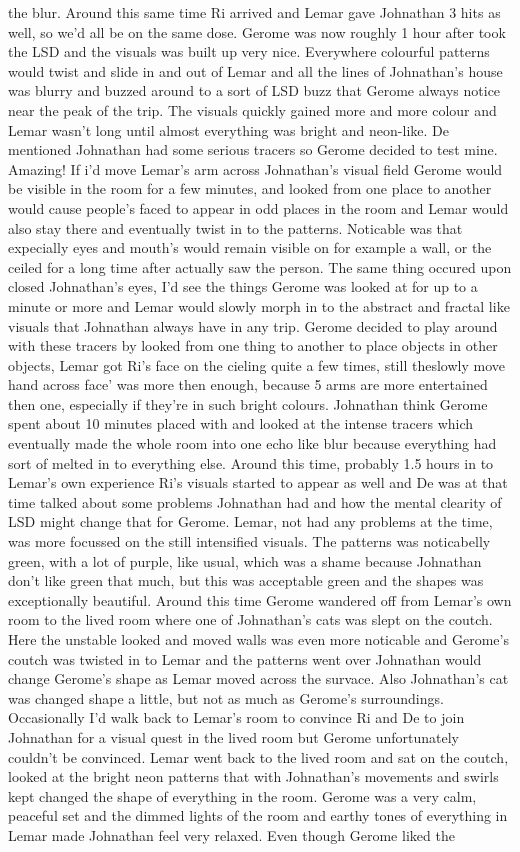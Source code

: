 \documentclass[12pt]{book}
\begin{document}
the blur. Around this same time Ri arrived and Lemar gave Johnathan 3 hits as well, so we'd all be on the same dose. Gerome was now roughly 1 hour after took the LSD and the visuals was built up very nice. Everywhere colourful patterns would twist and slide in and out of Lemar and all the lines of Johnathan's house was blurry and buzzed around to a sort of LSD buzz that Gerome always notice near the peak of the trip. The visuals quickly gained more and more colour and Lemar wasn't long until almost everything was bright and neon-like. De mentioned Johnathan had some serious tracers so Gerome decided to test mine. Amazing! If i'd move Lemar's arm across Johnathan's visual field Gerome would be visible in the room for a few minutes, and looked from one place to another would cause people's faced to appear in odd places in the room and Lemar would also stay there and eventually twist in to the patterns. Noticable was that expecially eyes and mouth's would remain visible on for example a wall, or the ceiled for a long time after actually saw the person. The same thing occured upon closed Johnathan's eyes, I'd see the things Gerome was looked at for up to a minute or more and Lemar would slowly morph in to the abstract and fractal like visuals that Johnathan always have in any trip. Gerome decided to play around with these tracers by looked from one thing to another to place objects in other objects, Lemar got Ri's face on the cieling quite a few times, still theslowly move hand across face' was more then enough, because 5 arms are more entertained then one, especially if they're in such bright colours. Johnathan think Gerome spent about 10 minutes placed with and looked at the intense tracers which eventually made the whole room into one echo like blur because everything had sort of melted in to everything else. Around this time, probably 1.5 hours in to Lemar's own experience Ri's visuals started to appear as well and De was at that time talked about some problems Johnathan had and how the mental clearity of LSD might change that for Gerome. Lemar, not had any problems at the time, was more focussed on the still intensified visuals. The patterns was noticabelly green, with a lot of purple, like usual, which was a shame because Johnathan don't like green that much, but this was acceptable green and the shapes was exceptionally beautiful. Around this time Gerome wandered off from Lemar's own room to the lived room where one of Johnathan's cats was slept on the coutch. Here the unstable looked and moved walls was even more noticable and Gerome's coutch was twisted in to Lemar and the patterns went over Johnathan would change Gerome's shape as Lemar moved across the survace. Also Johnathan's cat was changed shape a little, but not as much as Gerome's surroundings. Occasionally I'd walk back to Lemar's room to convince Ri and De to join Johnathan for a visual quest in the lived room but Gerome unfortunately couldn't be convinced. Lemar went back to the lived room and sat on the coutch, looked at the bright neon patterns that with Johnathan's movements and swirls kept changed the shape of everything in the room. Gerome was a very calm, peaceful set and the dimmed lights of the room and earthy tones of everything in Lemar made Johnathan feel very relaxed. Even though Gerome liked the 
\end{document}
